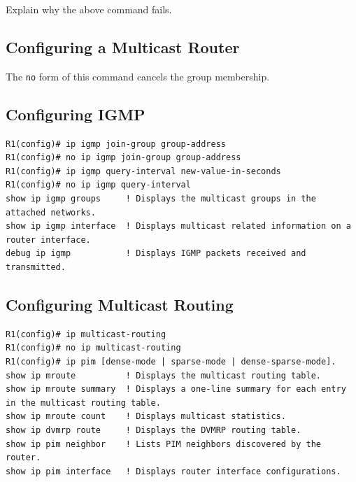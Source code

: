 \documentclass{UTNetLab}
\begin{document}
    \begin{report}
        \item Explain why the above command fails.
    \end{report}

\clearpage
\begin{appendices}

\section{Configuring a Multicast Router}
    The \lstinline[language={cisco}]{no} form of this command cancels the group membership.
    \begin{subappendices}
\subsection{Configuring IGMP}

    \begin{lstlisting}[language={cisco}, emph={group-address, new-value-in-seconds}]
R1(config)# ip igmp join-group group-address
R1(config)# no ip igmp join-group group-address
R1(config)# ip igmp query-interval new-value-in-seconds
R1(config)# no ip igmp query-interval
show ip igmp groups     ! Displays the multicast groups in the attached networks.
show ip igmp interface  ! Displays multicast related information on a router interface.
debug ip igmp           ! Displays IGMP packets received and transmitted.
    \end{lstlisting}

\subsection{Configuring Multicast Routing}

    \begin{lstlisting}[language={cisco}]
R1(config)# ip multicast-routing
R1(config)# no ip multicast-routing
R1(config)# ip pim [dense-mode | sparse-mode | dense-sparse-mode].
show ip mroute          ! Displays the multicast routing table.
show ip mroute summary  ! Displays a one-line summary for each entry in the multicast routing table.
show ip mroute count    ! Displays multicast statistics.
show ip dvmrp route     ! Displays the DVMRP routing table.
show ip pim neighbor    ! Lists PIM neighbors discovered by the router.
show ip pim interface   ! Displays router interface configurations.
    \end{lstlisting}


\end{subappendices}
\end{appendices}
\end{document}
